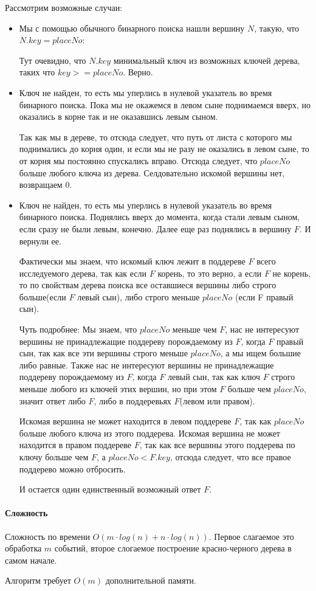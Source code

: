 \documentclass[12pt]{article}
\begin{document}
Рассмотрим возможные случаи:
\begin{itemize}
    \item Мы с помощью обычного бинарного поиска нашли вершину $ N $,
          такую, что $ N.key = placeNo $:

          Тут очевидно, что $ N.key $ минимальный ключ из возможных
          ключей дерева, таких что $ key >= placeNo $. Верно.

    \item Ключ не найден, то есть мы уперлись в нулевой указатель
          во время бинарного поиска.
          Пока мы не окажемся в левом сыне поднимаемся вверх, но
          оказались в корне так и не оказавшись левым сыном.

          Так как мы в дереве, то отсюда следует, что путь от листа
          с которого мы поднимались до корня один, и если мы не разу
          не оказались в левом сыне, то от корня мы постоянно спускались
          вправо. Отсюда следует, что $ placeNo $ больше любого ключа
          из дерева. Селдовательно искомой вершины нет, возвращаем 0.

    \item Ключ не найден, то есть мы уперлись в нулевой указатель
          во время бинарного поиска.
          Поднялись вверх до момента, когда стали левым сыном, если
          сразу не были левым, конечно. Далее еще раз поднялись в вершину
          $ F $. И вернули ее.

          Фактически мы знаем, что искомый ключ лежит в поддереве
          $ F $ всего исследуемого дерева, так как если $ F $ корень, то
          это верно, а если $ F $ не корень, то по свойствам дерева
          поиска все оставшиеся вершины либо строго больше(если $ F $
          левый сын), либо строго меньше $ placeNo $ (если F правый сын).

          Чуть подробнее:
          Мы знаем, что $ placeNo $ меньше чем $ F $, нас не интересуют
          вершины не принадлежащие поддереву порождаемому из $ F $,
          когда $ F $ правый сын, так как все эти вершины строго меньше
          $ placeNo $, а мы ищем большие либо равные.
          Также нас не интересуют вершины не принадлежащие поддереву
          порождаемому из $ F $, когда $ F $ левый сын, так как ключ
          $ F $ строго меньше любого из ключей этих вершин, но при этом
          $ F $ больше чем $ placeNo $, значит ответ либо $ F $, либо
          в поддеревьях $ F $(левом или правом).

          Искомая вершина не может находится в левом поддереве $ F $, так
          как $ placeNo $ больше любого ключа из этого поддерева.
          Искомая вершина не может находится в правом поддереве $ F $, так
          как все вершины этого поддерева по ключу больше чем $ F $, а
          $ placeNo < F.key $, отсюда следует, что все правое поддерево
          можно отбросить.

          И остается один единственный возможный ответ $ F $.
\end{itemize}

\paragraph{Сложность}
Сложность по времени $ O(m \cdot log(n) + n \cdot log(n)) $.
Первое слагаемое это обработка $ m $ событий, второе слогаемое построение
красно-черного дерева в самом начале.

Алгоритм требует $ O(m) $ дополнительной памяти.
\end{document}
